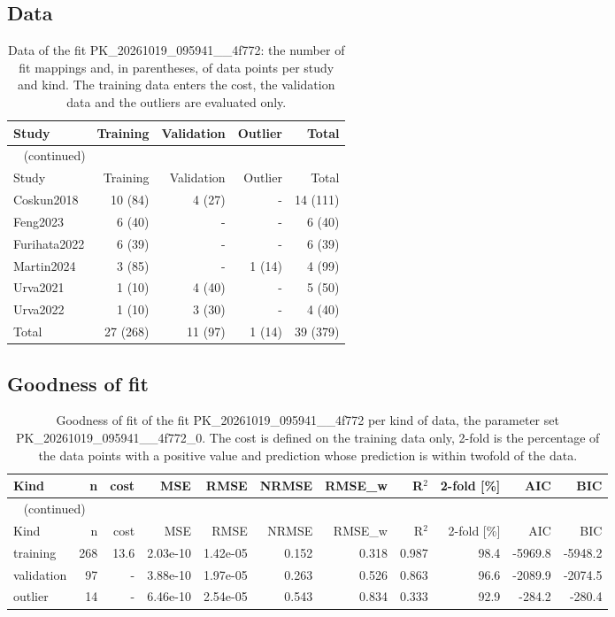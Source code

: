 \documentclass{article}
\begin{document}
\subsection{Data}

\begin{longtable}{lrrrr}
\caption{Data of the fit PK\_20261019\_095941\_\_4f772: the number of fit mappings and, in parentheses, of data points per study and kind. The training data enters the cost, the validation data and the outliers are evaluated only.}\label{tab:data:PK_20261019_095941__4f772} \\
\toprule
Study & Training & Validation & Outlier & Total \\
\midrule
\endfirsthead
\multicolumn{5}{l}{\small\tablename~\thetable{} (continued)} \\
\toprule
Study & Training & Validation & Outlier & Total \\
\midrule
\endhead
\bottomrule
\endlastfoot
Coskun2018 & 10 (84) & 4 (27) & - & 14 (111) \\
Feng2023 & 6 (40) & - & - & 6 (40) \\
Furihata2022 & 6 (39) & - & - & 6 (39) \\
Martin2024 & 3 (85) & - & 1 (14) & 4 (99) \\
Urva2021 & 1 (10) & 4 (40) & - & 5 (50) \\
Urva2022 & 1 (10) & 3 (30) & - & 4 (40) \\
Total & 27 (268) & 11 (97) & 1 (14) & 39 (379) \\
\end{longtable}

\subsection{Goodness of fit}

\begin{longtable}{lrrrrrrrrrr}
\caption{Goodness of fit of the fit PK\_20261019\_095941\_\_4f772 per kind of data, the parameter set PK\_20261019\_095941\_\_4f772\_0. The cost is defined on the training data only, 2-fold is the percentage of the data points with a positive value and prediction whose prediction is within twofold of the data.}\label{tab:metrics:PK_20261019_095941__4f772} \\
\toprule
Kind & n & cost & MSE & RMSE & NRMSE & RMSE\_w & R\ensuremath{^{2}} & 2-fold [\%] & AIC & BIC \\
\midrule
\endfirsthead
\multicolumn{11}{l}{\small\tablename~\thetable{} (continued)} \\
\toprule
Kind & n & cost & MSE & RMSE & NRMSE & RMSE\_w & R\ensuremath{^{2}} & 2-fold [\%] & AIC & BIC \\
\midrule
\endhead
\bottomrule
\endlastfoot
training & 268 & 13.6 & 2.03e-10 & 1.42e-05 & 0.152 & 0.318 & 0.987 & 98.4 & -5969.8 & -5948.2 \\
validation & 97 & - & 3.88e-10 & 1.97e-05 & 0.263 & 0.526 & 0.863 & 96.6 & -2089.9 & -2074.5 \\
outlier & 14 & - & 6.46e-10 & 2.54e-05 & 0.543 & 0.834 & 0.333 & 92.9 & -284.2 & -280.4 \\
\end{longtable}
\end{document}
